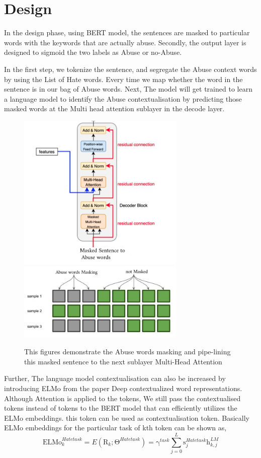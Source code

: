 \documentclass{article}
\begin{document}
\section{Design}
In the design phase, using BERT model, the sentences are masked to particular words with the keywords that are actually abuse. Secondly, the output layer is designed to sigmoid the two labels as Abuse or no-Abuse. 

In the first step, we tokenize the sentence, and segregate the Abuse context words by using the List of Hate words. Every time we map whether the word in the sentence is in our bag of Abuse words. Next, The model will get trained to learn a language model to identify the Abuse contextualisation by predicting those masked words at the Multi head attention\cite{choi2018fine} sublayer in the decode layer.

\begin{figure}[h]
\includegraphics[width=8cm]{images/Myopic.jpg}
\includegraphics[width=8cm]{images/attention_mask.jpg}

\caption{ This figures demonstrate the Abuse words masking and pipe-lining this masked sentence to the next sublayer Multi-Head Attention }
\label{fig:AttentionFig}
\end{figure} 

Further, The language model contextualisation can also be increased by introducing ELMo\cite{peters-etal-2018-deep} from the paper Deep contextualized word representations.
Although Attention is applied to the tokens, We still pass the contextualised tokens instead of tokens to the BERT model that can efficiently utilizes the ELMo embeddings. this token can be used as contextualisation token.
Basically ELMo embeddings for the particular task of kth token can be shown as,
\begin{equation*}
    \mathrm{ELMo}_{k}^{Hatetask} = E(\mathrm{R}_{k}^{};\mathrm{\Theta}^{Hatetask}) = \mathrm{\gamma}^{task}\sum_{j=0}^{L}\mathrm{s}_{j}^{Hatetask}\mathrm{h}_{k,j}^{LM}
\label{adkfdfi}
\end{equation*} 
\end{document}
